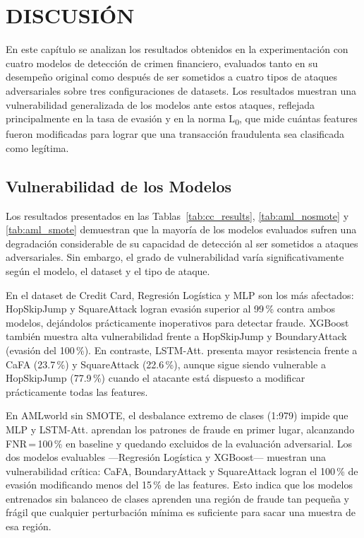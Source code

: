 \chapter{DISCUSIÓN}

En este capítulo se analizan los resultados obtenidos en la experimentación con cuatro modelos de detección de crimen financiero, evaluados tanto en su desempeño original como después de ser sometidos a cuatro tipos de ataques adversariales sobre tres configuraciones de datasets. Los resultados muestran una vulnerabilidad generalizada de los modelos ante estos ataques, reflejada principalmente en la tasa de evasión y en la norma L\textsubscript{0}, que mide cuántas features fueron modificadas para lograr que una transacción fraudulenta sea clasificada como legítima.

\section{Vulnerabilidad de los Modelos}

Los resultados presentados en las Tablas~\ref{tab:cc_results}, \ref{tab:aml_nosmote} y \ref{tab:aml_smote} demuestran que la mayoría de los modelos evaluados sufren una degradación considerable de su capacidad de detección al ser sometidos a ataques adversariales. Sin embargo, el grado de vulnerabilidad varía significativamente según el modelo, el dataset y el tipo de ataque.

En el dataset de Credit Card, Regresión Logística y MLP son los más afectados: HopSkipJump y SquareAttack logran evasión superior al 99\,\% contra ambos modelos, dejándolos prácticamente inoperativos para detectar fraude. XGBoost también muestra alta vulnerabilidad frente a HopSkipJump y BoundaryAttack (evasión del 100\,\%). En contraste, LSTM-Att. presenta mayor resistencia frente a CaFA (23.7\,\%) y SquareAttack (22.6\,\%), aunque sigue siendo vulnerable a HopSkipJump (77.9\,\%) cuando el atacante está dispuesto a modificar prácticamente todas las features.

En AMLworld sin SMOTE, el desbalance extremo de clases (1:979) impide que MLP y LSTM-Att. aprendan los patrones de fraude en primer lugar, alcanzando FNR\,=\,100\,\% en baseline y quedando excluidos de la evaluación adversarial. Los dos modelos evaluables —Regresión Logística y XGBoost— muestran una vulnerabilidad crítica: CaFA, BoundaryAttack y SquareAttack logran el 100\,\% de evasión modificando menos del 15\,\% de las features. Esto indica que los modelos entrenados sin balanceo de clases aprenden una región de fraude tan pequeña y frágil que cualquier perturbación mínima es suficiente para sacar una muestra de esa región.

